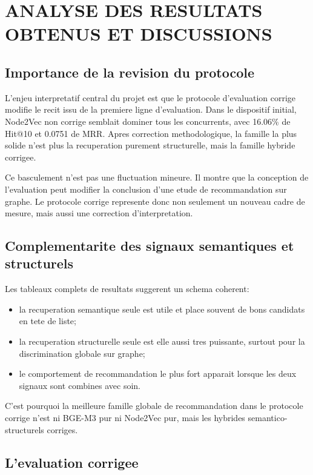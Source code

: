 \chapter{ANALYSE DES RESULTATS OBTENUS ET DISCUSSIONS}
\thispagestyle{empty}

\section{Importance de la revision du protocole}

L'enjeu interpretatif central du projet est que le protocole d'evaluation
corrige modifie le recit issu de la premiere ligne d'evaluation. Dans le
dispositif initial, Node2Vec non corrige semblait dominer tous les
concurrents, avec 16.06\% de Hit@10 et 0.0751 de MRR. Apres correction
methodologique, la famille la plus solide n'est plus la recuperation purement
structurelle, mais la famille hybride corrigee.

Ce basculement n'est pas une fluctuation mineure. Il montre que la conception
de l'evaluation peut modifier la conclusion d'une etude de recommandation sur
graphe. Le protocole corrige represente donc non seulement un nouveau cadre de
mesure, mais aussi une correction d'interpretation.

\section{Complementarite des signaux semantiques et structurels}

Les tableaux complets de resultats suggerent un schema coherent:
\begin{itemize}
    \item la recuperation semantique seule est utile et place souvent de bons
    candidats en tete de liste;
    \item la recuperation structurelle seule est elle aussi tres puissante,
    surtout pour la discrimination globale sur graphe;
    \item le comportement de recommandation le plus fort apparait lorsque les
    deux signaux sont combines avec soin.
\end{itemize}

C'est pourquoi la meilleure famille globale de recommandation dans le protocole
corrige n'est ni BGE-M3 pur ni Node2Vec pur, mais les hybrides
semantico-structurels corriges.

\section{L'evaluation corrigee}

